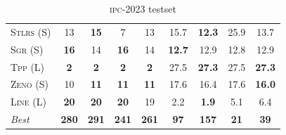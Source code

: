 \begin{table}[tb]
{\begin{tabular}{|l||cccc||cccc||}
\textsc{Stlrs} (S)&13&\textbf{15}&7&13&15.7&\textbf{12.3}&25.9&13.7\\
\textsc{Sgr} (S)&\textbf{16}&14&\textbf{16}&14&\textbf{12.7}&12.9&12.8&12.9\\
\textsc{Tpp} (L)&\textbf{2}&\textbf{2}&\textbf{2}&\textbf{2}&27.5&\textbf{27.3}&27.5&\textbf{27.3}\\
\textsc{Zeno} (S)&10&\textbf{11}&\textbf{11}&\textbf{11}&17.6&16.4&17.6&\textbf{16.0}\\
\textsc{Line} (L)&\textbf{20}&\textbf{20}&\textbf{20}&19&2.2&\textbf{1.9}&5.1&6.4
\\\hline
\textit{Best}&\textbf{280}&\textbf{291}&\textbf{241}&\textbf{261}&\textbf{97}&\textbf{157}&\textbf{21}&\textbf{39}\\\hline

        \end{tabular}}
        \caption{\textsc{ipc}-2023 testset}
        \label{tab:ipc}
        \end{table}
        